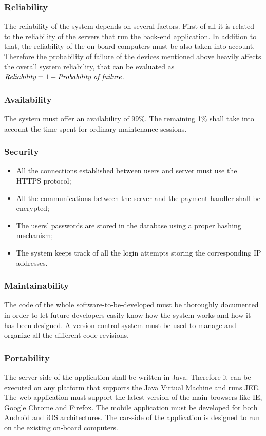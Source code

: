 \subsubsection{Reliability}
The reliability of the system depends on several factors. First of all it is related to the reliability of the servers that run the back-end application. In addition to that, the reliability of the on-board computers must be also taken into account. Therefore the probability of failure of the devices mentioned above heavily affects the overall system reliability, that can be evaluated as $\emph{Reliability} = 1-\emph{Probability of failure}$.

\subsubsection{Availability}
The system must offer an availability of 99\%. The remaining 1\% shall take into account the time spent for ordinary maintenance sessions.

\subsubsection{Security}
\begin{itemize}
\item All the connections established between users and server must use the HTTPS protocol;
\item All the communications between the server and the payment handler shall be encrypted;
\item The users' passwords are stored in the database using a proper hashing mechanism;
\item The system keeps track of all the login attempts storing the corresponding IP addresses.
\end{itemize}

\subsubsection{Maintainability}
The code of the whole software-to-be-developed must be thoroughly documented in order to let future developers easily know how the system works and how it has been designed. A version control system must be used to manage and organize all the different code revisions.

\subsubsection{Portability}
The server-side of the application shall be written in Java. Therefore it can be executed on any platform that supports the Java Virtual Machine and runs JEE. The web application must support the latest version of the main browsers like IE, Google Chrome and Firefox. The mobile application must be developed for both Android and iOS architectures.
The car-side of the application is designed to run on the existing on-board computers. 

